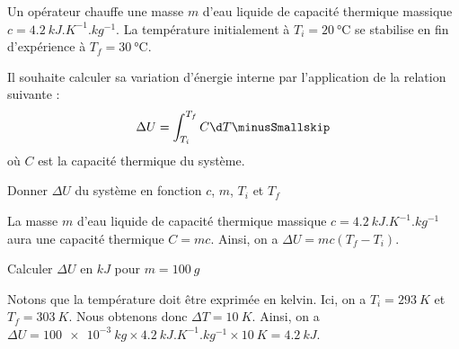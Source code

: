 Un opérateur chauffe une masse $m$ d'eau liquide de capacité thermique massique $c=\SI{4,2 }{kJ.K^{-1}.kg^{-1}}$. La température initialement à $T_i=\SI{20}{\celsius}$ se stabilise en fin d'expérience à $T_f=\SI{30}{\celsius}$.

Il souhaite calculer sa variation d'énergie interne par l'application de la relation suivante : \minusSmallskip
\[
\Delta U = \int_{T_{i}}^{T_{f}} C \d T \minusSmallskip
\]
où $C$ est la capacité thermique du système.

\debutEntrainement


\begin{enonce}
Donner $\Delta U$ du système en fonction $c$, $m$, $T_i$ et $T_f$
\end{enonce}


\begin{corrige}
	La masse $m$ d'eau liquide de capacité thermique massique $c=\SI{4,2 }{kJ.K^{-1}.kg^{-1}}$ aura une capacité thermique $C=m c$. Ainsi, on a  
	$\Delta U  =  m c ( T_f - T_i)$.
\end{corrige}

\begin{enonce}
	Calculer $\Delta U$ en $\si{kJ}$ pour $m=\SI{100}{g}$ 
\end{enonce}


\begin{corrige}
	Notons que la température doit être exprimée en kelvin. Ici, on a $T_i=\SI{293}{K}$ et $T_f=\SI{303}{K}$. Nous obtenons donc $\Delta T=\SI{10}{K}$. 
	Ainsi, on a $\Delta U = \SI{100e-3}{kg} \times \SI{4,2 }{kJ.K^{-1}.kg^{-1}} \times \SI{10}{K}=\SI{4,2}{kJ}$.
\end{corrige}




\finEntrainement

